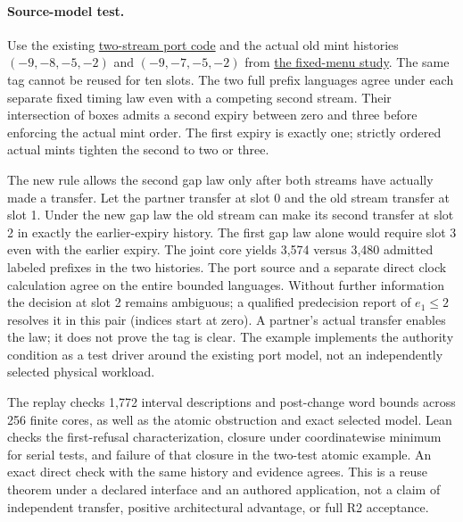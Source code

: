 \documentclass{article}
\begin{document}
\paragraph{Source-model test.}
Use the existing \href{https://github.com/eternal-november/eos-research-programmes/pull/390}{two-stream port code} and the actual old mint histories \((-9,-8,-5,-2)\) and \((-9,-7,-5,-2)\) from \href{https://github.com/eternal-november/eos-research-programmes/pull/448}{the fixed-menu study}. The same tag cannot be reused for ten slots. The two full prefix languages agree under each separate fixed timing law even with a competing second stream. Their intersection of boxes admits a second expiry between zero and three before enforcing the actual mint order. The first expiry is exactly one; strictly ordered actual mints tighten the second to two or three.

The new rule allows the second gap law only after both streams have actually made a transfer. Let the partner transfer at slot 0 and the old stream transfer at slot 1. Under the new gap law the old stream can make its second transfer at slot 2 in exactly the earlier-expiry history. The first gap law alone would require slot 3 even with the earlier expiry. The joint core yields 3,574 versus 3,480 admitted labeled prefixes in the two histories. The port source and a separate direct clock calculation agree on the entire bounded languages. Without further information the decision at slot 2 remains ambiguous; a qualified predecision report of \(e_1\le2\) resolves it in this pair (indices start at zero). A partner's actual transfer enables the law; it does not prove the tag is clear. The example implements the authority condition as a test driver around the existing port model, not an independently selected physical workload.

The replay checks 1,772 interval descriptions and post-change word bounds across 256 finite cores, as well as the atomic obstruction and exact selected model. Lean checks the first-refusal characterization, closure under coordinatewise minimum for serial tests, and failure of that closure in the two-test atomic example. An exact direct check with the same history and evidence agrees. This is a reuse theorem under a declared interface and an authored application, not a claim of independent transfer, positive architectural advantage, or full R2 acceptance.
\end{document}
